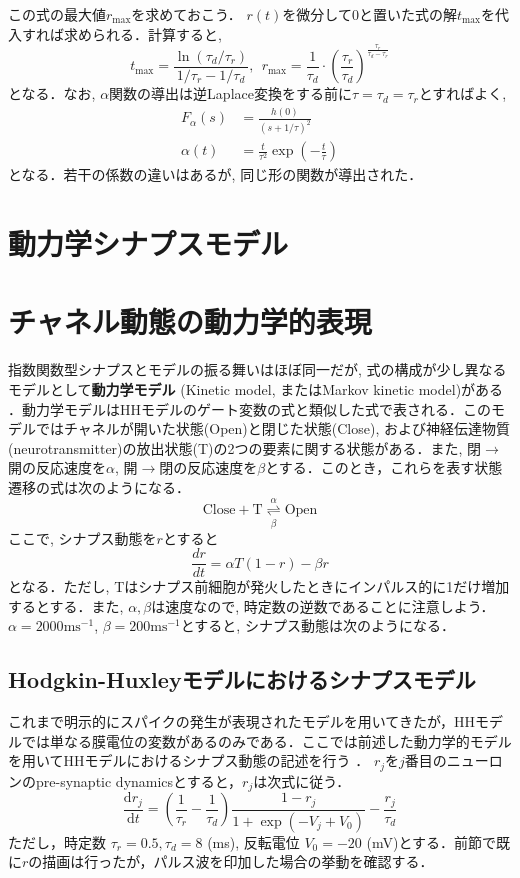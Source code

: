 この式の最大値$r_{\max}$を求めておこう． $r(t)$を微分して0と置いた式の解$t_{\max}$を代入すれば求められる．計算すると, 
\begin{equation}
t_{\max}=\dfrac{\ln(\tau_d/\tau_r)}{1/\tau_r-1/\tau_d},\ \ r_{\max}=\dfrac{1}{\tau_{d}}\cdot \left(\dfrac{\tau_{r}}{\tau_{d}}\right)^{\frac{\tau_{r}}{\tau_d-\tau_{r}}}    
\end{equation}
となる．なお, $\alpha$関数の導出は逆Laplace変換をする前に$\tau=\tau_d=\tau_r$とすればよく, 
\begin{align}
F_\alpha(s)&=\frac{h(0)}{(s+1/\tau)^2}\\
\alpha(t)&=\frac{t}{\tau^2}\exp\left(-\frac{t}{\tau}\right)
\end{align}
となる．若干の係数の違いはあるが, 同じ形の関数が導出された． 
\section{動力学シナプスモデル}
\section{チャネル動態の動力学的表現}
指数関数型シナプスとモデルの振る舞いはほぼ同一だが, 式の構成が少し異なるモデルとして\textbf{動力学モデル} (Kinetic model, またはMarkov kinetic model)がある \citep{Destexhe1994-ro}．動力学モデルはHHモデルのゲート変数の式と類似した式で表される．このモデルではチャネルが開いた状態(Open)と閉じた状態(Close), および神経伝達物質(neurotransmitter)の放出状態(T)の2つの要素に関する状態がある．また, 閉$\to$開の反応速度を$\alpha$, 開$\to$閉の反応速度を$\beta$とする．このとき，これらを表す状態遷移の式は次のようになる．
\begin{equation}
\text{Close}+\text{T}  \underset{\beta}{\overset{\alpha}{\rightleftharpoons}}\text{Open}    
\end{equation}
ここで, シナプス動態を$r$とすると
\begin{equation}
\frac{dr}{dt}=\alpha T (1-r) - \beta r
\end{equation}
となる．ただし, Tはシナプス前細胞が発火したときにインパルス的に1だけ増加するとする．また, $\alpha, \beta$は速度なので, 時定数の逆数であることに注意しよう． $\alpha=2000 \text{ms}^{-1}$, $\beta=200 \text{ms}^{-1}$とすると, シナプス動態は次のようになる．
\subsection{Hodgkin-Huxleyモデルにおけるシナプスモデル}
これまで明示的にスパイクの発生が表現されたモデルを用いてきたが，HHモデルでは単なる膜電位の変数があるのみである．ここでは前述した動力学的モデルを用いてHHモデルにおけるシナプス動態の記述を行う \citep{Destexhe1994-ro,Batista2014-ax}．
$r_{j}$を$j$番目のニューロンのpre-synaptic dynamicsとすると，$r_{j}$は次式に従う．
\begin{equation}
\frac{\mathrm{d} r_{j}}{\mathrm{d} t}=\left(\frac{1}{\tau_{r}}-\frac{1}{\tau_{d}}\right) \frac{1-r_{j}}{1+\exp \left(-V_{j}+V_{0}\right)}-\frac{r_{j}}{\tau_{d}}
\end{equation}
ただし，時定数 $\tau_r=0.5, \tau_d = 8$ (ms), 反転電位 $V_0 = -20$ (mV)とする．前節で既に$r$の描画は行ったが，パルス波を印加した場合の挙動を確認する．
